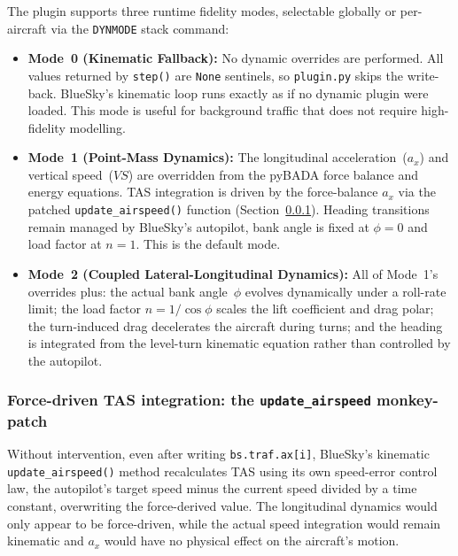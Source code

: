 The plugin supports three runtime fidelity modes, selectable globally or per-aircraft via the \texttt{DYNMODE} stack command:
\begin{itemize}
    \item \textbf{Mode~0 (Kinematic Fallback):} No dynamic overrides are performed.  All values returned by \texttt{step()} are \texttt{None} sentinels, so \texttt{plugin.py} skips the write-back.  BlueSky's kinematic loop runs exactly as if no dynamic plugin were loaded.  This mode is useful for background traffic that does not require high-fidelity modelling.

    \item \textbf{Mode~1 (Point-Mass Dynamics):} The longitudinal acceleration~($a_x$) and vertical speed~($VS$) are overridden from the pyBADA force balance and energy equations.  TAS integration is driven by the force-balance $a_x$ via the patched \texttt{update\_airspeed()} function (Section~\ref{sec:monkey_patch}).  Heading transitions remain managed by BlueSky's autopilot, bank angle is fixed at $\phi = 0$ and load factor at $n = 1$.  This is the default mode.

    \item \textbf{Mode~2 (Coupled Lateral-Longitudinal Dynamics):} All of Mode~1's overrides plus: the actual bank angle~$\phi$ evolves dynamically under a roll-rate limit; the load factor $n = 1/\cos\phi$ scales the lift coefficient and drag polar; the turn-induced drag decelerates the aircraft during turns; and the heading is integrated from the level-turn kinematic equation rather than controlled by the autopilot.
\end{itemize}

\subsubsection{Force-driven TAS integration: the \texttt{update\_airspeed} monkey-patch}
\label{sec:monkey_patch}

Without intervention, even after writing \texttt{bs.traf.ax[i]}, BlueSky's kinematic \texttt{update\_airspeed()} method recalculates TAS using its own speed-error control law, the autopilot's target speed minus the current speed divided by a time constant, overwriting the force-derived value.  The longitudinal dynamics would only appear to be force-driven, while the actual speed integration would remain kinematic and $a_x$ would have no physical effect on the aircraft's motion.

